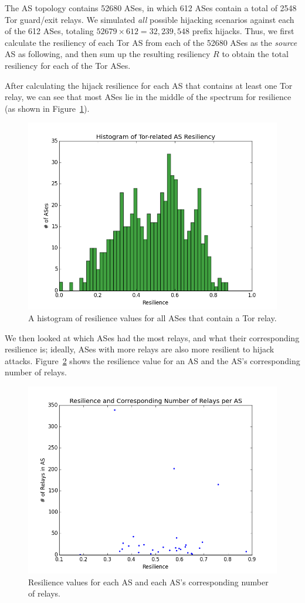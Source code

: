 The AS topology contains 52680 ASes, in which 612 ASes contain a total of 2548 Tor guard/exit relays. We simulated \emph{all} possible hijacking scenarios against each of the 612 ASes, totaling $52679 \times 612 = 32,239,548$ prefix hijacks. Thus, we first calculate the resiliency of each Tor AS from each of the 52680 ASes as the \emph{source} AS as following, and then sum up the resulting resiliency $R$ to obtain the total resiliency for each of the Tor ASes. 

After calculating the hijack resilience for each AS that contains at least one Tor relay, we can see that most ASes lie in the middle of the spectrum for resilience (as shown in Figure~\ref{fig:resilience_histogram}).

\begin{figure}
\centering
\includegraphics[width=.5\textwidth]{resilience_histogram}
\caption{A histogram of resilience values for all ASes that contain a Tor relay.}
\label{fig:resilience_histogram}
\end{figure}

We then looked at which ASes had the most relays, and what their corresponding resilience is; ideally, ASes with more relays are also more resilient to hijack attacks.  Figure~\ref{fig:res_relays} shows the resilience value for an AS and the AS's corresponding number of relays.  

\begin{figure}
\centering
\includegraphics[width=.5\textwidth]{res_num_relays}
\caption{Resilience values for each AS and each AS's corresponding number of relays.}
\label{fig:res_relays}
\end{figure}

